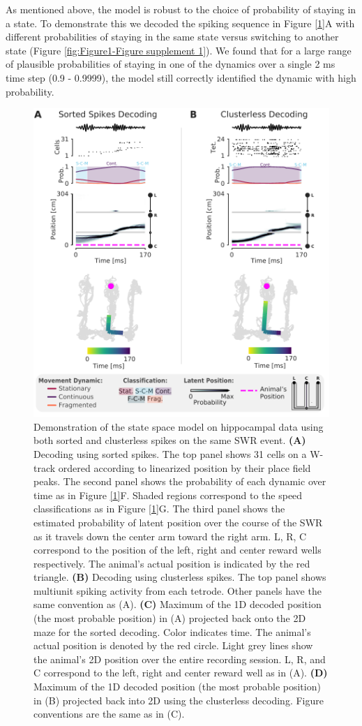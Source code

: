 \documentclass[times, twoside]{zHenriquesLab-StyleBioRxiv}
\begin{document}
As mentioned above, the model is robust to the choice of probability of staying in a state. To demonstrate this we decoded the spiking sequence in Figure \ref{1}A with different probabilities of staying in the same state versus switching to another state (Figure \ref{fig:Figure1-Figure supplement 1}). We found that for a large range of plausible probabilities of staying in one of the dynamics over a single 2 ms time step (0.9 - 0.9999), the model still correctly identified the dynamic with high probability.

\begin{figure}%
\centering
\includegraphics[width=0.80\linewidth]{figures/Figure2/Figure2_v5}
\caption{Demonstration of the state space model on hippocampal data using both sorted and clusterless spikes on the same SWR event. \textbf{(A)} Decoding using sorted spikes. The top panel shows 31 cells on a W-track ordered according to linearized position by their place field peaks. The second panel shows the probability of each dynamic over time as in Figure \ref{1}F. Shaded regions correspond to the speed classifications as in Figure \ref{1}G. The third panel shows the estimated probability of latent position over the course of the SWR as it travels down the center arm toward the right arm. L, R, C correspond to the position of the left, right and center reward wells respectively. The animal's actual position is indicated by the red triangle. \textbf{(B)} Decoding using clusterless spikes. The top panel shows multiunit spiking activity from each tetrode. Other panels have the same convention as (A).  \textbf{(C)} Maximum of the 1D decoded position (the most probable position) in (A) projected back onto the 2D maze for the sorted decoding. Color indicates time. The animal's actual position is denoted by the red circle. Light grey lines show the animal's 2D position over the entire recording session. L, R, and C correspond to the left, right and center reward well as in (A). \textbf{(D)} Maximum of the 1D decoded position (the most probable position) in (B) projected back into 2D using the clusterless decoding. Figure conventions are the same as in (C).
}
\label{2}
\end{figure}
\end{document}
